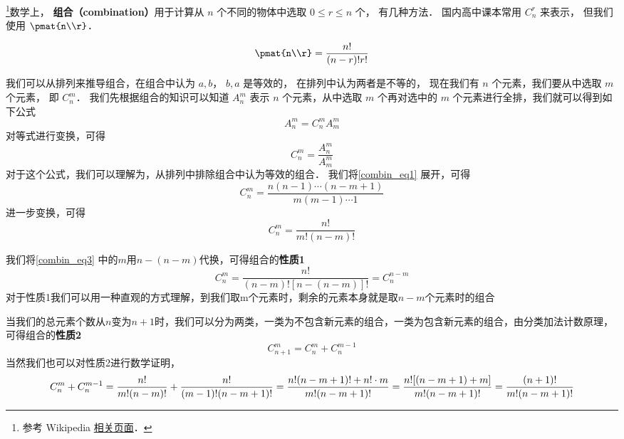 
\begin{issues}
\issueDraft
\end{issues}


\footnote{参考 Wikipedia \href{https://en.wikipedia.org/wiki/Combination}{相关页面}．}数学上， \textbf{组合（combination）}用于计算从 $n$ 个不同的物体中选取 $0 \leqslant r \leqslant n$ 个， 有几种方法． 国内高中课本常用 $C_n^r$ 来表示， 但我们使用 $\pmat{n\\r}$．

\begin{equation}
\pmat{n\\r} = \frac{n!}{(n-r)!r!}
\end{equation}

我们可以从排列来推导组合，在组合中认为 ${a,b}$， ${b,a}$ 是等效的， 在排列中认为两者是不等的， 现在我们有 $n$ 个元素，我们要从中选取 $m$ 个元素， 即 $C_n^m$．
我们先根据组合的知识可以知道 $A_n^m$ 表示 $n$ 个元素，从中选取 $m$ 个再对选中的 $m$ 个元素进行全排，我们就可以得到如下公式
\begin{equation}
A_n^m = C_n^m A_m^m
\end{equation}
对等式进行变换，可得
\begin{equation}\label{combin_eq1}
C_n^m = \frac{A_n^m}{A_m^m}
\end{equation}
对于这个公式，我们可以理解为，从排列中排除组合中认为等效的组合．
我们将\autoref{combin_eq1} 展开，可得
\begin{equation}\label{combin_eq2}
C_n^m = \frac{n(n - 1) \cdots (n - m + 1)}{m(m-1)\cdots 1}
\end{equation}
进一步变换，可得
\begin{equation}\label{combin_eq3}
C_n^m = \frac{n!}{m!(n-m)!}
\end{equation}

我们将\autoref{combin_eq3} 中的$m$用$n-(n-m)$代换，可得组合的\textbf{性质1}
\begin{equation}
C_n^m = \frac{n!}{(n-m)![n-(n-m)]!} = C_n^{n-m}
\end{equation}
对于性质1我们可以用一种直观的方式理解，到我们取m个元素时，剩余的元素本身就是取$n-m$个元素时的组合

当我们的总元素个数从$n$变为$n+1$时，我们可以分为两类，一类为不包含新元素的组合，一类为包含新元素的组合，由分类加法计数原理，可得组合的\textbf{性质2}
\begin{equation}
C_{n + 1}^m = C_n^m + C_n^{m - 1}
\end{equation}
当然我们也可以对性质2进行数学证明，
\begin{equation}
C_n^m + C_n^{m - 1} = \frac{n!}{m!(n-m)!} + \frac{n!}{(m - 1)!(n - m + 1)!}\\=\frac{n!(n - m + 1)! + n!\cdot m}{m!(n - m +1)!}=\frac{n![(n - m + 1) + m]}{m!(n - m + 1)!}=\frac{(n + 1)!}{m!(n - m + 1)!}
\end{equation}